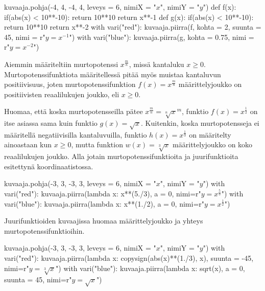 \begin{center}
\begin{kuva}
    kuvaaja.pohja(-4, 4, -4, 4, leveys = 6, nimiX = "$x$", nimiY = "$y$")
    def f(x):
      if(abs(x) < 10**-10): return 10**10
      return x**-1
    def g(x):
      if(abs(x) < 10**-10): return 10**10
      return x**-2
    with vari("red"): kuvaaja.piirra(f, kohta = 2, suunta = 45, nimi = r"$y=x^{-1}$")
    with vari("blue"): kuvaaja.piirra(g, kohta = 0.75, nimi = r"$y=x^{-2}$")
\end{kuva}
\end{center}

Aiemmin määriteltiin murtopotenssi $x^{\frac{m}{n}}$, missä kantaluku $x\geq0$. Murtopotenssifunktiota määritellessä pitää myös muistaa kantaluvun positiivisuus, joten murtopotenssifunktion $f(x)=x^{\frac{m}{n}}$ määrittelyjoukko on positiivisten reaalilukujen joukko, eli $x\geq0$.

Huomaa, että koska murtopotensseilla pätee $x^{\frac{m}{n}}={\sqrt[n]{x}}^m$, funktio $f(x)=x^{\frac{1}{2}}$ on itse asiassa sama kuin funktio $g(x)=\sqrt{x}$. Kuitenkin, koska murtopotensseja ei määritellä negatiivisilla kantaluvuilla, funktio $h(x)=x^{\frac{1}{3}}$ on määritelty ainoastaan kun $x\geq0$, mutta funktion $w(x)=\sqrt[3]{x}$ määrittelyjoukko on koko reaalilukujen joukko. Alla jotain murtopotenssifunktioita ja juurifunktioita esitettynä koordinaatistossa.

\begin{center}
\begin{kuva}
    kuvaaja.pohja(-3, 3, -3, 3, leveys = 6, nimiX = "$x$", nimiY = "$y$")
    with vari("red"): kuvaaja.piirra(lambda x: x**(5./3), a = 0, nimi=r"$y=x^\frac{5}{3}$")
    with vari("blue"): kuvaaja.piirra(lambda x: x**(1./2), a = 0, nimi=r"$y=x^\frac{1}{2}$")
\end{kuva}
\end{center}

Juurifunktioiden kuvaajissa huomaa määrittelyjoukko ja yhteys murtopotenssifunktioihin.

\begin{center}
\begin{kuva}
    kuvaaja.pohja(-3, 3, -3, 3, leveys = 6, nimiX = "$x$", nimiY = "$y$")
    with vari("red"): kuvaaja.piirra(lambda x: copysign(abs(x)**(1./3), x), suunta = -45, nimi=r"$y=\sqrt[3]{x}$")
    with vari("blue"): kuvaaja.piirra(lambda x: sqrt(x), a = 0, suunta = 45, nimi=r"$y=\sqrt{x}$")
\end{kuva}
\end{center}

